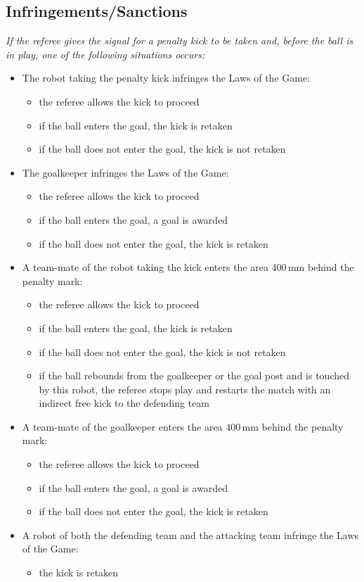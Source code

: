 \subsection{Infringements/Sanctions}
\textit{If the referee gives the signal for a penalty kick to be taken and, before the ball is in play, one of the following situations occurs:}
\begin{itemize}
\item The robot taking the penalty kick infringes the Laws of the Game:
  \begin{itemize}
  \item the referee allows the kick to proceed
  \item if the ball enters the goal, the kick is retaken
  \item if the ball does not enter the goal, the kick is not retaken
  \end{itemize}

\item The goalkeeper infringes the Laws of the Game:
  \begin{itemize}
  \item the referee allows the kick to proceed
  \item if the ball enters the goal, a goal is awarded
  \item if the ball does not enter the goal, the kick is retaken
  \end{itemize}

\item A team-mate of the robot taking the kick enters the area 400\,mm behind the penalty mark:
  \begin{itemize}
  \item the referee allows the kick to proceed
  \item if the ball enters the goal, the kick is retaken
  \item if the ball does not enter the goal, the kick is not retaken
  \item if the ball rebounds from the goalkeeper or the goal post and is  touched by this robot, the referee stops play and restarts the match with an indirect free kick to the defending team
  \end{itemize}

\item A team-mate of the goalkeeper enters the area 400\,mm behind the penalty mark:
\begin{itemize}
\item the referee allows the kick to proceed
\item if the ball enters the goal, a goal is awarded
\item if the ball does not enter the goal, the kick is retaken
\end{itemize}

\item A robot of both the defending team and the attacking team infringe the Laws of the Game:
  \begin{itemize}
  \item the kick is retaken
  \end{itemize}
\end{itemize}

